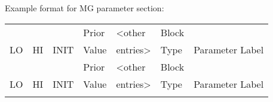 Example format for MG parameter section:
\begin{center}

	\begin{longtable}{p{1cm} p{1cm} p{1cm}  p{1.5cm}  p{1.5cm}  p{1.5cm}  p{5cm}  }
		\hline
		 &  &  & Prior &  <other & Block &  \\
		LO & HI & INIT & Value &  entries> & Type & Parameter Label \\
		\hline
		\endfirsthead

		\hline
		&  &  & Prior &  <other & Block &  \\
		LO & HI & INIT & Value &  entries> & Type & Parameter Label \\
		\hline
		\endhead

		\endfoot

		\endlastfoot


\end{longtable}
\end{center}
